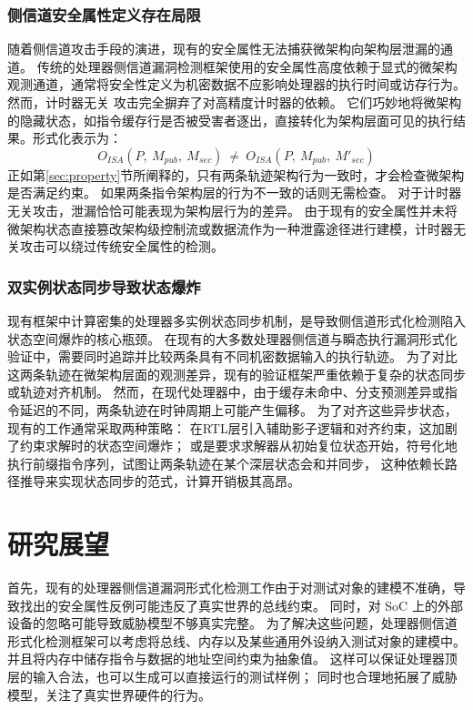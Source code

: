 \subsubsection{侧信道安全属性定义存在局限}
随着侧信道攻击手段的演进，现有的安全属性无法捕获微架构向架构层泄漏的通道。
传统的处理器侧信道漏洞检测框架使用的安全属性高度依赖于显式的微架构观测通道，通常将安全性定义为机密数据不应影响处理器的执行时间或访存行为。
然而，计时器无关\cite{10.1145/3719027.3744833}\cite{10.1145/3719027.3765061}\cite{291182} 攻击完全摒弃了对高精度计时器的依赖。
它们巧妙地将微架构的隐藏状态，如指令缓存行是否被受害者逐出，直接转化为架构层面可见的执行结果。形式化表示为：
$$O_{ISA}(P,\ M_{pub},\ M_{sec})\ \neq\ O_{ISA}(P,\ M_{pub},\ M'_{sec})$$
正如第\ref{sec:property}节所阐释的，只有两条轨迹架构行为一致时，才会检查微架构是否满足约束。
如果两条指令架构层的行为不一致的话则无需检查。
对于计时器无关攻击，泄漏恰恰可能表现为架构层行为的差异。
由于现有的安全属性并未将微架构状态直接篡改架构级控制流或数据流作为一种泄露途径进行建模，计时器无关攻击可以绕过传统安全属性的检测。

\subsubsection{双实例状态同步导致状态爆炸}
现有框架中计算密集的处理器多实例状态同步机制，是导致侧信道形式化检测陷入状态空间爆炸的核心瓶颈。
在现有的大多数处理器侧信道与瞬态执行漏洞形式化验证中，需要同时追踪并比较两条具有不同机密数据输入的执行轨迹。
为了对比这两条轨迹在微架构层面的观测差异，现有的验证框架严重依赖于复杂的状态同步或轨迹对齐机制。
然而，在现代处理器中，由于缓存未命中、分支预测差异或指令延迟的不同，两条轨迹在时钟周期上可能产生偏移。
为了对齐这些异步状态，现有的工作通常采取两种策略：
在RTL层引入辅助影子逻辑和对齐约束\cite{10.1145/3669940.3707243}，这加剧了约束求解时的状态空间爆炸；
或是要求求解器从初始复位状态开始，符号化地执行前缀指令序列\cite{10.1145/3613424.3614254}，试图让两条轨迹在某个深层状态会和并同步，
这种依赖长路径推导来实现状态同步的范式，计算开销极其高昂。


\section{研究展望}
首先，现有的处理器侧信道漏洞形式化检测工作由于对测试对象的建模不准确，导致找出的安全属性反例可能违反了真实世界的总线约束。
同时，对 SoC 上的外部设备的忽略可能导致威胁模型不够真实完整。
为了解决这些问题，处理器侧信道形式化检测框架可以考虑将总线、内存以及某些通用外设纳入测试对象的建模中。
并且将内存中储存指令与数据的地址空间约束为抽象值。
这样可以保证处理器顶层的输入合法，也可以生成可以直接运行的测试样例；
同时也合理地拓展了威胁模型，关注了真实世界硬件的行为。

